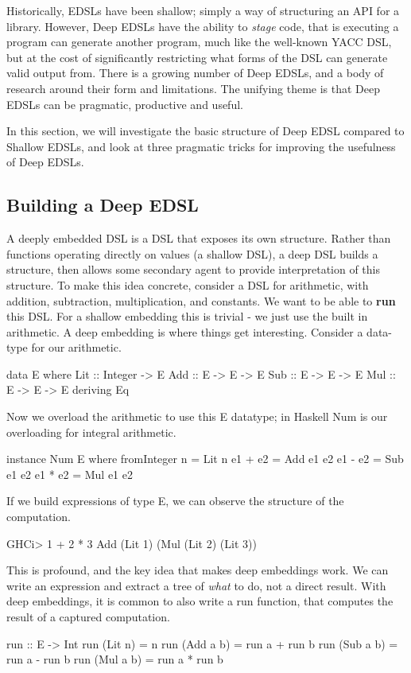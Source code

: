 \documentclass[11pt]{article}
\begin{document}
Historically, EDSLs have been shallow; simply a way of structuring an API for a library. 
However, Deep EDSLs have the ability to {\em stage\/} code, that is executing a program
can generate another program, much like the well-known YACC DSL,
but at the cost of significantly restricting what forms of the DSL can
generate valid output from.
There is a growing number of Deep EDSLs, and a body of research around their
form and limitations.
The unifying theme is that Deep EDSLs can be pragmatic, productive and useful.

In this section, we will investigate the basic structure of Deep EDSL compared to Shallow EDSLs,
and look at three pragmatic tricks for improving the usefulness of Deep EDSLs.

\subsection{Building a Deep EDSL}

A deeply embedded DSL is a DSL that exposes its own structure.
Rather than functions operating directly on values (a shallow DSL),
a deep DSL builds a structure, then allows some secondary agent to
provide interpretation of this structure.
To make this idea concrete, consider a DSL for arithmetic,
with addition, subtraction, multiplication, and constants.
We want to be able to {\bf run\/} this DSL. For a shallow
embedding this is trivial - we just use the built in 
arithmetic. A deep embedding is where things get
interesting. Consider a data-type for our arithmetic.

\begin{Code}
data E where
 Lit :: Integer -> E
 Add :: E -> E -> E
 Sub :: E -> E -> E
 Mul :: E -> E -> E
 deriving Eq
\end{Code}

Now we overload the arithmetic to use this E datatype;
in Haskell Num is our overloading for integral arithmetic.

\begin{Code}
instance Num E where
  fromInteger n = Lit n
  e1 + e2 = Add e1 e2
  e1 - e2 = Sub e1 e2
  e1 * e2 = Mul e1 e2
\end{Code}

If we build expressions of type E, we can
observe the structure of the computation.
\begin{Code}
GHCi> 1 + 2 * 3
Add (Lit 1) (Mul (Lit 2) (Lit 3))
\end{Code}

This is profound, and the key idea that makes deep embeddings work. We can write
an expression and extract a tree of {\em what\/} to do, not a direct result.
With deep embeddings, it is common to also
write a run function, that computes the result
of a captured computation.
\begin{Code}
run :: E -> Int
run (Lit n)   = n
run (Add a b) = run a + run b
run (Sub a b) = run a - run b
run (Mul a b) = run a * run b
\end{Code}
\end{document}
